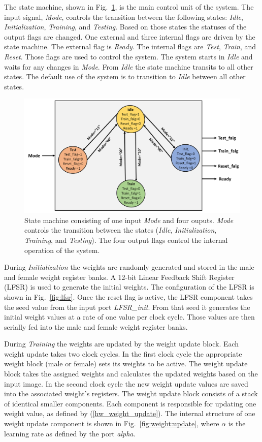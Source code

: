 \documentclass[10pt,journal]{IEEEtran}
\newcommand{\fig}[1]{Fig.~\ref{#1}}
\newcommand{\eq}[1]{(\ref{#1})}
\begin{document}
			The state machine, shown in \fig{fig:state:machine}, is the main control unit of the system. The input signal, \textit{Mode}, controls the transition between the following states: \textit{Idle}, \textit{Initialization}, \textit{Training}, and \textit{Testing}. Based on those states the statuses of the output flags are changed. One external and three internal flags are driven by the state machine. The external flag is \textit{Ready}. The internal flags are \textit{Test}, \textit{Train}, and \textit{Reset}. Those flags are used to control the system. The system starts in \textit{Idle} and waits for any changes in \textit{Mode}. From \textit{Idle} the state machine transits to all other states. The default use of the system is to transition to \textit{Idle} between all other states.
			
			\begin{figure}
				\centering
				\includegraphics[width=0.8\linewidth]{State_machine}
				\caption{State machine consisting of one input \textit{Mode} and four ouputs. \textit{Mode} controls the transition between the states (\textit{Idle}, \textit{Initialization}, \textit{Training}, and \textit{Testing}). The four output flags control the internal operation of the system.}
				\label{fig:state:machine}
			\end{figure}
			
			During \textit{Initialization} the weights are randomly generated and stored in the male and female weight register banks. A 12-bit Linear Feedback Shift Register (LFSR) is used to generate the initial weights. The configuration of the LFSR is shown in \fig{fig:lfsr}. Once the reset flag is active, the LFSR component takes the seed value from the input port \textit{LFSR\_init}. From that seed it generates the initial weight values at a rate of one value per clock cycle. Those values are then serially fed into the male and female weight register banks.
			
			During \textit{Training} the weights are updated by the weight update block. Each weight update takes two clock cycles. In the first clock cycle the appropriate weight block (male or female) sets its weights to be active. The weight update block takes the assigned weights and calculates the updated weights based on the input image. In the second clock cycle the new weight update values are saved into the associated weight's registers. The weight update block consists of a stack of identical smaller components. Each component is responsible for updating one weight value, as defined by \eq{hw_weight_update}. The internal structure of one weight update component is shown in \fig{fig:weight:update}, where \(\alpha\) is the learning rate as defined by the port \textit{alpha}.
			
\end{document}
